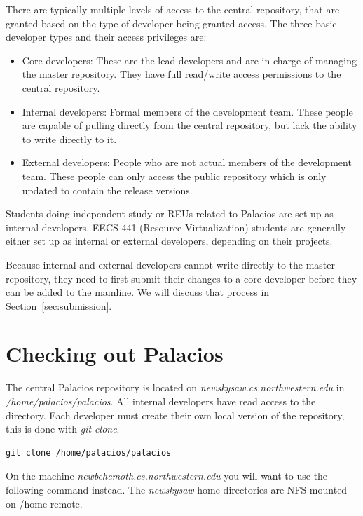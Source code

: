\documentclass[11pt]{article}
\begin{document}
There are typically multiple levels of access to the central
repository, that are granted based on the type of developer being
granted access. The three basic developer types and their access
privileges are:

\begin{itemize}
\item Core developers: These are the lead developers and are in
charge of managing the master repository. They have full read/write
access permissions to the central repository.

\item Internal developers: Formal members of the development
team. These people are capable of pulling directly from the central
repository, but lack the ability to write directly to it. 

\item External developers: People who are not actual members of the
development team. These people can only access the public repository
which is only updated to contain the release versions. 
\end{itemize}

Students doing independent study or REUs related to Palacios are set
up as internal developers.  EECS 441 (Resource Virtualization)
students are generally either set up as internal or external
developers, depending on their projects.

Because internal and external developers cannot write directly to the
master repository, they need to first submit their changes to a core
developer before they can be added to the mainline. We will discuss
that process in Section~\ref{sec:submission}.


\section{Checking out Palacios}

The central Palacios repository is located on {\em
newskysaw.cs.northwestern.edu} in {\em /home/palacios/palacios}. All
internal developers have read access to the directory. Each developer
must create their own local version of the repository, this is done
with {\em git clone}.

\begin{verbatim}
git clone /home/palacios/palacios
\end{verbatim}

On the machine {\em newbehemoth.cs.northwestern.edu} you will want to
use the following command instead. The {\em newskysaw} home
directories are NFS-mounted on /home-remote.
\end{document}
